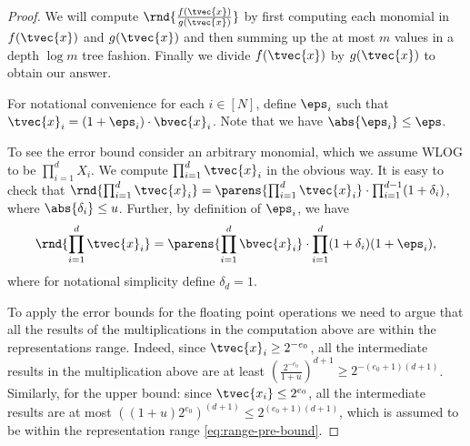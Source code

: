 \documentclass[11pt]{article}
\begin{document}
\begin{proof}
    We will compute $\rnd{\frac{f(\tvec{x})}{g(\tvec{x})} }$ by first computing each monomial in $f(\tvec{x})$ and $g(\tvec{x})$ and then summing up the at most $m$ values in a depth $\log{m}$ tree fashion. Finally we divide $f(\tvec{x})$ by $g(\tvec{x})$ to obtain our answer.
    
    For notational convenience for each $i\in [N]$, define $\eps_i$ such that $\tvec{x}_i = (1+\eps_i)\cdot \bvec{x}_i$. Note that we have $\abs{\eps_i}\le \eps$.
    
    To see the error bound consider an arbitrary monomial, which we assume WLOG to be $\prod_{i=1}^d X_i$. We compute $\prod_{i=1}^d \tvec{x}_i$ in the obvious way. It is easy to check that $\rnd{\prod_{i=1}^d \tvec{x}_i}=\parens{\prod_{i=1}^d \tvec{x}_i}\cdot \prod_{i=1}^{d-1}(1+\delta_i)$, where $\abs{\delta_i}\le u$. Further, by definition of $\eps_i$, we have
    \[\rnd{\prod_{i=1}^d \tvec{x}_i}=\parens{\prod_{i=1}^d \bvec{x}_i}\cdot \prod_{i=1}^{d}(1+\delta_i)(1+\eps_i),\]
    where for notational simplicity define $\delta_d=1$.
    
    To apply the error bounds for the floating point operations we need to argue that all the results of the multiplications in the computation above are within the representations range. Indeed, since $\tvec{x}_i \geq 2^{-e_0}$, all the intermediate results in the multiplication above are at least $\left(\frac{2^{-e_0}}{1 + u}\right)^{d+1} \geq 2^{-(e_0 + 1)(d+1)}$. Similarly, for the upper bound: since $\tvec{x_i} \leq 2^{e_0}$, all the intermediate results are at most $\left((1+u)2^{e_0}\right)^{(d+1)} \leq 2^{(e_0 + 1)(d+1)}$, which is assumed to be within the representation range \eqref{eq:range-pre-bound}. 
    

\end{proof}
\end{document}
